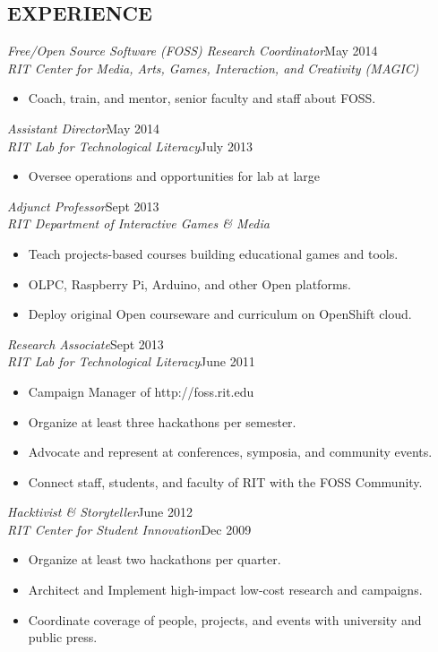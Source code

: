 \documentclass[margin]{res}
\newcommand{\wherewhen}[2]{{\sl #1}\hfill #2}
\begin{document}
\begin{resume}
\section{EXPERIENCE}
    \wherewhen{Free/Open Source Software (FOSS) Research Coordinator}{May 2014}\\
    \wherewhen{RIT Center for Media, Arts, Games, Interaction, and Creativity (MAGIC)}{}
    \begin{itemize}
        \item Coach, train, and mentor, senior faculty and staff about FOSS.
    \end{itemize}

    \wherewhen{Assistant Director}{May 2014}\\
    \wherewhen{RIT Lab for Technological Literacy}{July 2013}
    \begin{itemize}
        \item Oversee operations and opportunities for lab at large
    \end{itemize}

    \wherewhen{Adjunct Professor}{Sept 2013}\\
    \wherewhen{RIT Department of Interactive Games \& Media}{}
    \begin{itemize}
        \item Teach projects-based courses building educational games and tools.
        \item OLPC, Raspberry Pi, Arduino, and other Open platforms.
        \item Deploy original Open courseware and curriculum on OpenShift cloud.
    \end{itemize}

    \wherewhen{Research Associate}{Sept 2013}\\
    \wherewhen{RIT Lab for Technological Literacy}{June 2011}
    \begin{itemize}
        \item Campaign Manager of http://foss.rit.edu
        \item Organize at least three hackathons per semester.
        \item Advocate and represent at conferences, symposia, and community events.
        \item Connect staff, students, and faculty of RIT with the FOSS Community.
    \end{itemize}

    \wherewhen{Hacktivist \& Storyteller}{June 2012}\\
    \wherewhen{RIT Center for Student Innovation}{Dec 2009}
    \begin{itemize}
        \item Organize at least two hackathons per quarter.
        \item Architect and Implement high-impact low-cost research and campaigns.
        \item Coordinate coverage of people, projects, and events with university and public press.
    \end{itemize}


\end{resume}
\end{document}
